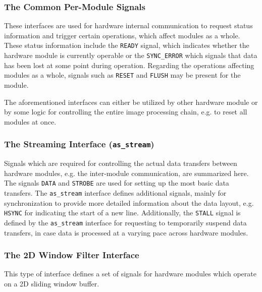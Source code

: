 \subsubsection{The Common Per-Module Signals}
These interfaces are used for hardware internal communication to request status information and trigger certain operations, which affect modules as a whole.
These status information include the \texttt{READY} signal, which indicates whether the hardware module is currently operable or the \texttt{SYNC\_ERROR} which signals that data has been lost at some point during operation.
Regarding the operations affecting modules as a whole, signals such as \texttt{RESET} and \texttt{FLUSH} may be present for the module.

The aforementioned interfaces can either be utilized by other \asterics hardware module or by some logic for controlling the entire image processing chain, e.g. to reset all modules at once.  

\subsubsection{The \asterics Streaming Interface (\texttt{as\_stream})}
Signals which are required for controlling the actual data transfers between hardware modules, e.g. the inter-module communication, are summarized here.
The signals \texttt{DATA} and \texttt{STROBE} are used for setting up the most basic data transfers.
The \texttt{as\_stream} interface defines additional signals, mainly for synchronization to provide more detailed information about the data layout, e.g. \texttt{HSYNC} for indicating the start of a new line.
Additionally, the \texttt{STALL} signal is defined by the \texttt{as\_stream} interface for requesting to temporarily suspend data transfers, in case data is processed at a varying pace across hardware modules.


\subsubsection{The \asterics 2D Window Filter Interface}
This type of interface defines a set of signals for hardware modules which operate on a 2D sliding window buffer.


